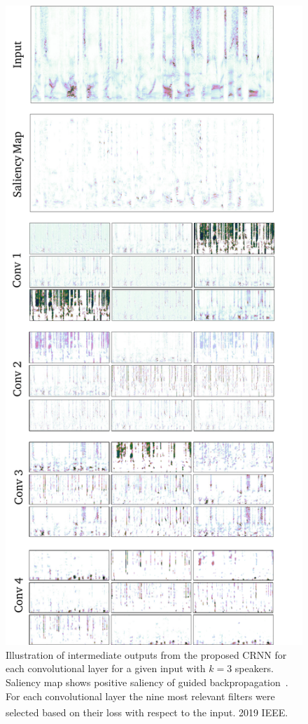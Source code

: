 \begin{figure}[t]
  \includegraphics[width=\columnwidth, height=0.7\paperheight, keepaspectratio]{Chapters/08_Analysis_CountNet/figures/outputs.pdf}
  \caption{Illustration of intermediate outputs from the proposed CRNN for each convolutional layer for a given input with \(k=3\) speakers. Saliency map shows positive saliency of guided backpropagation~\cite{Springenberg14}. For each convolutional layer the nine most relevant filters were selected based on their loss with respect to the input. \textsuperscript{\textregistered}2019 IEEE.}%
\label{fig:convoutputs}
\end{figure}
